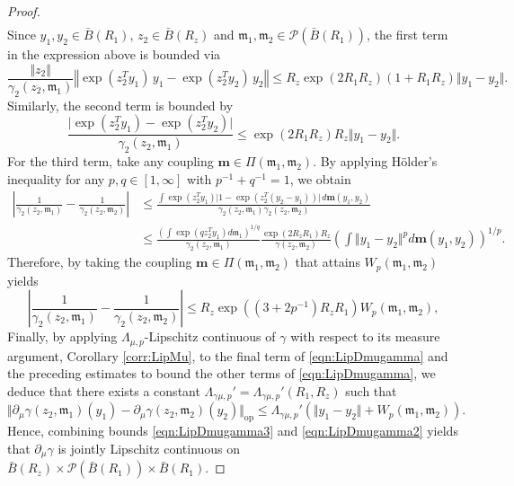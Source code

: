 \documentclass{article}
\begin{document}
\begin{appendices}
\begin{proof}
\begin{align}
\end{align}
Since $y_1,y_2\in \bar B(R_1)$, $z_2\in \bar B(R_z)$ and $\mathfrak{m}_1,\mathfrak{m}_2 \in \mathcal P(\bar B(R_1))$, the first term in the expression above is bounded via
\[
\frac{\Vert z_2\Vert}{\gamma_2(z_2,\mathfrak{m}_1)}\left\Vert \exp(z_2^Ty_1)\,y_1-\exp(z_2^Ty_2)\,y_2\right\Vert\le R_z\exp(2R_1R_z)\left(1+R_1R_z \right)\Vert y_1-y_2\Vert.
\]
Similarly, the second term is bounded by
\[
\frac{\vert \exp(z_2^Ty_1)-\exp(z_2^Ty_2)\vert}{\gamma_2(z_2,\mathfrak{m}_1)}\le \exp(2 R_1R_z)R_z \Vert y_1-y_2\Vert.
\]
For the third term, take any coupling $\bm{m}\in \Pi(\mathfrak{m}_1,\mathfrak{m}_2)$. By applying H\"older's inequality for any $p,q \in [1,\infty]$ with $p^{-1}+q^{-1}=1$, we obtain
\begin{align*}
    \left\vert \frac{1}{\gamma_2(z_2,\mathfrak{m}_1)}-\frac{1}{\gamma_2(z_2,\mathfrak{m}_2)}\right\vert&\le \frac{\int \exp(z_2^Ty_1)\vert 1-\exp(z_2^T(y_2-y_1))\vert\,d \bm{m}(y_1,y_2)}{\gamma_2(z_2,\mathfrak{m}_1)\gamma_2(z_2,\mathfrak{m}_2)}\\&\le\frac{\left(\int \exp(q z_2^Ty_1)d\mathfrak{m}_1\right)^{1/q}}{\gamma_2(z_2,\mathfrak{m}_1)} \frac{\exp(2R_zR_1)R_z}{\gamma(z_2,\mathfrak{m}_2)}\left( \int \Vert y_1-y_2\Vert^p d\bm{m}(y_1,y_2)\right)^{1/p}.
\end{align*}
Therefore, by taking the coupling $\bm{m}\in \Pi(\mathfrak{m}_1,\mathfrak{m}_2)$ that attains $W_p(\mathfrak{m}_1,\mathfrak{m}_2)$ yields
\begin{equation}\label{eqn:Lipinversegamma2}
    \left\vert \frac{1}{\gamma_2(z_2,\mathfrak{m}_1)}-\frac{1}{\gamma_2(z_2,\mathfrak{m}_2)}\right\vert\le R_z\exp((3+2p^{-1}) R_zR_1)W_p(\mathfrak{m}_1,\mathfrak{m}_2),
\end{equation}
Finally, by applying $\Lambda_{\mu,p}$-Lipschitz continuous of $\gamma$ with respect to its measure argument, Corollary \ref{corr:LipMu}, to the final term of \eqref{eqn:LipDmugamma} and the preceding estimates to bound the other terms of \eqref{eqn:LipDmugamma}, we deduce that there exists a constant $\Lambda_{\gamma\mu,p}'=\Lambda_{\gamma\mu,p}'(R_1,R_z)$ such that
\begin{equation}\label{eqn:LipDmugamma2}
    \Vert \partial_\mu\gamma(z_2,\mathfrak{m}_1)(y_1)-\partial_\mu\gamma(z_2,\mathfrak{m}_2)(y_2)\Vert_\mathrm{op}\le\Lambda_{\gamma\mu,p}' \left(\Vert y_1-y_2 \Vert + W_p(\mathfrak{m}_1,\mathfrak{m}_2)\right).
\end{equation}
Hence, combining bounds \eqref{eqn:LipDmugamma3} and \eqref{eqn:LipDmugamma2} yields that $\partial_\mu \gamma$ is jointly Lipschitz continuous on \\$\bar B(R_z)\times \mathcal P(\bar B(R_1)) \times \bar B(R_1)$.

\end{proof}
\end{appendices}
\end{document}
